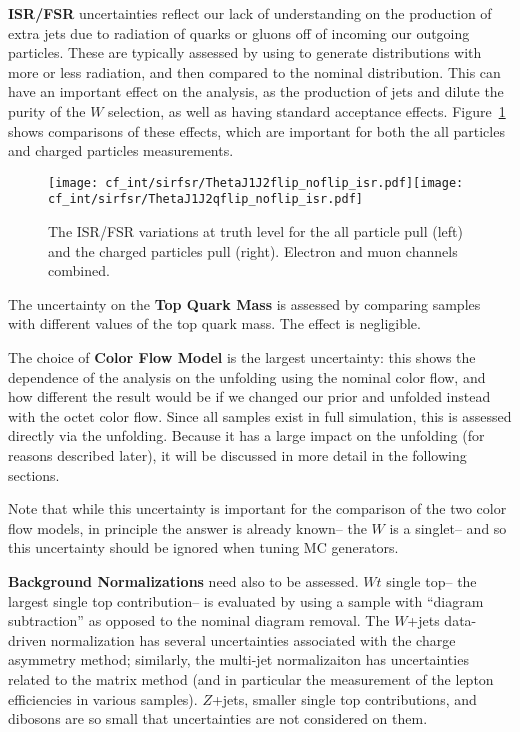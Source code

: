 	\textbf{ISR/FSR} uncertainties reflect our lack of understanding on the production of extra jets due to radiation of quarks or gluons off of incoming our outgoing particles. These are typically assessed by using \Acermc to generate distributions with more or less radiation, and then compared to the nominal distribution. This can have an important effect on the analysis, as the production of jets and dilute the purity of the $W$ selection, as well as having standard acceptance effects. Figure~\ref{fig:color:uncertainties:theory:ISRFSR} shows comparisons of these effects, which are important for both the all particles and charged particles measurements.

\begin{figure}[h!]
\begin{center}
\texttt{[image: cf\_int/sirfsr/ThetaJ1J2flip\_noflip\_isr.pdf]}\texttt{[image: cf\_int/sirfsr/ThetaJ1J2qflip\_noflip\_isr.pdf]}
\caption{The ISR/FSR variations at truth level for the all particle pull (left) and the charged particles pull (right).  Electron and muon channels combined.}
\label{fig:color:uncertainties:theory:ISRFSR}
\end{center}
\end{figure}

	The uncertainty on the \textbf{Top Quark Mass} is assessed by comparing samples with different values of the top quark mass. The effect is negligible.

	The choice of \textbf{Color Flow Model} is the largest uncertainty: this shows the dependence of the analysis on the unfolding using the nominal color flow, and how different the result would be if we changed our prior and unfolded instead with the octet color flow. Since all samples exist in full simulation, this is assessed directly via the unfolding. Because it has a large impact on the unfolding (for reasons described later), it will be discussed in more detail in the following sections.

	Note that while this uncertainty is important for the comparison of the two color flow models, in principle the answer is already known-- the $W$ is a singlet-- and so this uncertainty should be ignored when tuning MC generators.

	\textbf{Background Normalizations} need also to be assessed. $Wt$ single top-- the largest single top contribution-- is evaluated by using a sample with ``diagram subtraction'' as opposed to the nominal diagram removal. The $W$+jets data-driven normalization has several uncertainties associated with the charge asymmetry method; similarly, the multi-jet normalizaiton has uncertainties related to the matrix method (and in particular the measurement of the lepton efficiencies in various samples). $Z$+jets, smaller single top contributions, and dibosons are so small that uncertainties are not considered on them. 

